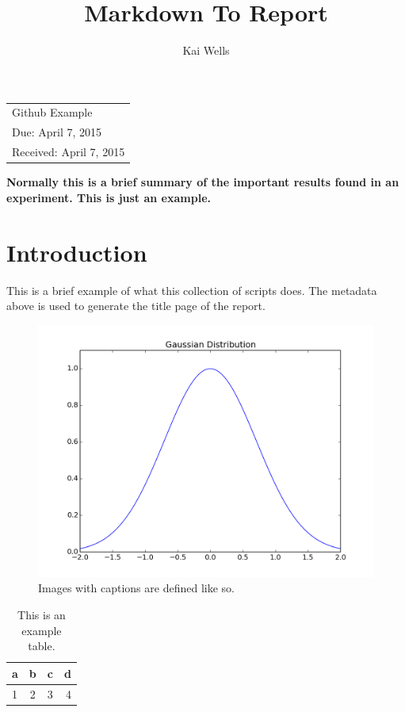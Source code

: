 \documentclass[11pt, oneside]{article}
\title{Markdown To Report\\\vspace{0.5em}{\large A collection of scripts to generate LaTeX formatted PDFs}}
\author{Kai Wells}
\date{}
\def\maxwidth{0.6\columnwidth}
\let\Oldincludegraphics\includegraphics
\renewcommand{\includegraphics}[1]{\Oldincludegraphics[width=\maxwidth]{#1}}
\begin{document}
\maketitle
\begin{table}[H]
\centering
\begin{tabular}{l}
Github Example\\
Due: April 7, 2015\\
Received: April 7, 2015\\
\end{tabular}
\end{table}
\begin{noindent}
\textbf{Normally this is a brief summary of the important results found in an experiment. This is just an example.}
\end{noindent}

\newpage
\doublespacing
{}

\section{Introduction}

This is a brief example of what this collection of scripts does. The metadata above is used to generate the title page of the report.

\begin{figure}[H]
\centering
\includegraphics{graph.png}
\caption{Images with captions are defined like so.}
\label{fig:labels-are-required}
\end{figure}

\begin{table}[H]
\caption{This is an example table.}
\centering
\begin{tabular}{|l|ccr|}
\hline
a & b & c & d\\
\hline
1 & 2 & 3 & 4\\
\hline
\end{tabular}
\label{table:labels-are-required-too}
\end{table}
\end{document}
